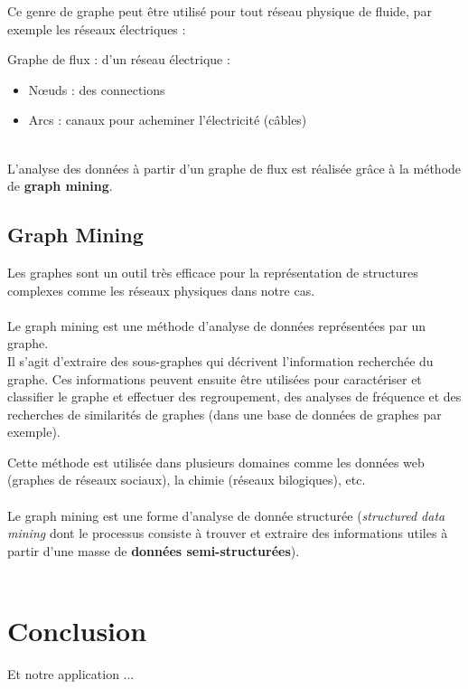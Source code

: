	\begin{frame}
		Ce genre de graphe peut être utilisé pour tout réseau physique de fluide, par exemple les réseaux électriques :
		\pause
		\begin{exampleblock}{Graphe de flux : d'un réseau électrique :}
		\begin{itemize}
		\item Nœuds : des connections
		\item Arcs : canaux pour acheminer l'électricité (câbles)
		\end{itemize}
		\end{exampleblock}
		~\\
		\pause
		L'analyse des données à partir d'un graphe de flux est réalisée grâce à la méthode de \textbf{graph mining}.
	\end{frame}	
	
	\subsection{Graph Mining}
	\begin{frame}
		Les graphes sont un outil très efficace pour la représentation de structures complexes comme les réseaux physiques dans notre cas.\\~\\
		\pause
		Le graph mining est une méthode d'analyse de données représentées par un graphe.\\ 
		\pause
		Il s'agit d'extraire des sous-graphes qui décrivent l'information recherchée du graphe. Ces informations peuvent ensuite être utilisées pour caractériser et classifier le graphe et effectuer des regroupement, des analyses de fréquence et des recherches de similarités de graphes (dans une base de données de graphes par exemple).
	\end{frame}
	\begin{frame}
		Cette méthode est utilisée dans plusieurs domaines comme les données web (graphes de réseaux sociaux), la chimie (réseaux bilogiques), etc.
		\\~\\
		\pause
		Le graph mining est une forme d'analyse de donnée structurée (\textit{structured data mining} dont le processus consiste à trouver et extraire des informations utiles à partir d'une masse de \textbf{données semi-structurées}).
		\\~\\
	\end{frame}
	
	\section{Conclusion}
	\begin{frame}
		Et notre application ...
	\end{frame}


